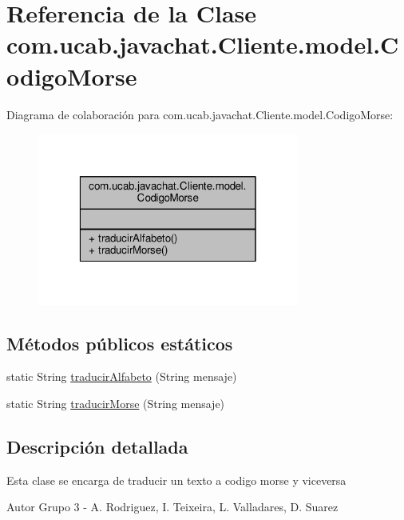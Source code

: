 \hypertarget{classcom_1_1ucab_1_1javachat_1_1_cliente_1_1model_1_1_codigo_morse}{\section{Referencia de la Clase com.\-ucab.\-javachat.\-Cliente.\-model.\-Codigo\-Morse}
\label{classcom_1_1ucab_1_1javachat_1_1_cliente_1_1model_1_1_codigo_morse}
}


Diagrama de colaboración para com.\-ucab.\-javachat.\-Cliente.\-model.\-Codigo\-Morse\-:\nopagebreak
\begin{figure}[H]
\begin{center}
\leavevmode
\includegraphics[width=244pt]{classcom_1_1ucab_1_1javachat_1_1_cliente_1_1model_1_1_codigo_morse__coll__graph}
\end{center}
\end{figure}
\subsection*{Métodos públicos estáticos}
\begin{DoxyCompactItemize}
\item 
static String \hyperlink{classcom_1_1ucab_1_1javachat_1_1_cliente_1_1model_1_1_codigo_morse_a043b70b087c4b8b530dc3eb03289fc98}{traducir\-Alfabeto} (String mensaje)
\item 
static String \hyperlink{classcom_1_1ucab_1_1javachat_1_1_cliente_1_1model_1_1_codigo_morse_aaff032c4492797c05151156469193c35}{traducir\-Morse} (String mensaje)
\end{DoxyCompactItemize}


\subsection{Descripción detallada}
Esta clase se encarga de traducir un texto a codigo morse y viceversa \begin{DoxyAuthor}{Autor}
Grupo 3 -\/ A. Rodriguez, I. Teixeira, L. Valladares, D. Suarez 
\end{DoxyAuthor}


